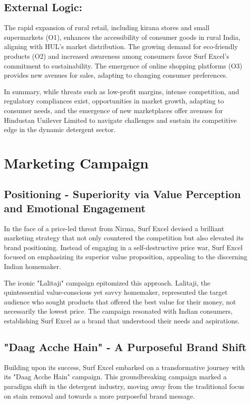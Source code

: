 \subsection{External Logic:}

The rapid expansion of rural retail, including kirana stores and small supermarkets (O1), enhances the accessibility of consumer goods in rural India, aligning with HUL's market distribution. The growing demand for eco-friendly products (O2) and increased awareness among consumers favor Surf Excel's commitment to sustainability. The emergence of online shopping platforms (O3) provides new avenues for sales, adapting to changing consumer preferences.

In summary, while threats such as low-profit margins, intense competition, and regulatory compliances exist, opportunities in market growth, adapting to consumer needs, and the emergence of new marketplaces offer avenues for Hindustan Unilever Limited to navigate challenges and sustain its competitive edge in the dynamic detergent sector.

\section{Marketing Campaign}

\subsection{Positioning - Superiority via Value Perception and Emotional Engagement
}
In the face of a price-led threat from Nirma, Surf Excel devised a brilliant marketing strategy that not only countered the competition but also elevated its brand positioning. Instead of engaging in a self-destructive price war, Surf Excel focused on emphasizing its superior value proposition, appealing to the discerning Indian homemaker.

The iconic "Lalitaji" campaign epitomized this approach. Lalitaji, the quintessential value-conscious yet savvy homemaker, represented the target audience who sought products that offered the best value for their money, not necessarily the lowest price. The campaign resonated with Indian consumers, establishing Surf Excel as a brand that understood their needs and aspirations.

\subsection{"Daag Acche Hain" - A Purposeful Brand Shift}
Building upon its success, Surf Excel embarked on a transformative journey with its "Daag Acche Hain" campaign. This groundbreaking campaign marked a paradigm shift in the detergent industry, moving away from the traditional focus on stain removal and towards a more purposeful brand message.

